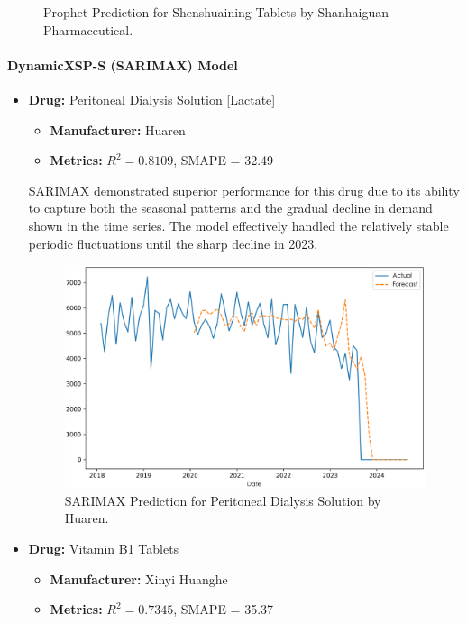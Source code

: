 \documentclass[journal]{IEEEtran}
\begin{document}
\begin{itemize}
\begin{figure}[H]
\caption{Prophet Prediction for Shenshuaining Tablets by Shanhaiguan Pharmaceutical.}
\label{fig:shenshuaining}
\end{figure}
\end{itemize}

\paragraph{DynamicXSP-S (SARIMAX) Model}
\begin{itemize}
\item \textbf{Drug:} Peritoneal Dialysis Solution [Lactate]
\begin{itemize}
\item \textbf{Manufacturer:} Huaren
\item \textbf{Metrics:} $R^2 = 0.8109$, SMAPE = 32.49
\end{itemize}
SARIMAX demonstrated superior performance for this drug due to its ability to capture both the seasonal patterns and the gradual decline in demand shown in the time series. The model effectively handled the relatively stable periodic fluctuations until the sharp decline in 2023.
\begin{figure}[H]
\centering
\includegraphics[width=\linewidth]{../Result_Paper/SARIMAX_Prediction_腹膜透析液[乳酸盐]_华仁.png}
\caption{SARIMAX Prediction for Peritoneal Dialysis Solution by Huaren.}
\label{fig:peritoneal}
\end{figure}
\item \textbf{Drug:} Vitamin B1 Tablets
\begin{itemize}
\item \textbf{Manufacturer:} Xinyi Huanghe
\item \textbf{Metrics:} $R^2 = 0.7345$, SMAPE = 35.37
\end{itemize}

\end{itemize}
\end{document}
